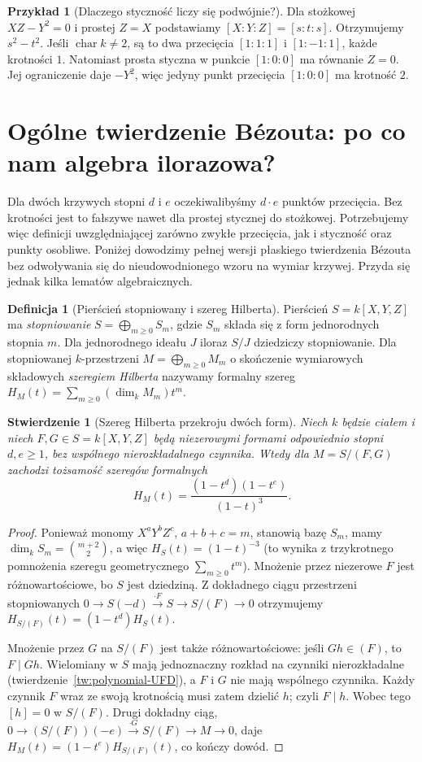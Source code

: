 \documentclass[11pt,a4paper,openany]{report}
\numberwithin{equation}{section}
\theoremstyle{plain}
\newtheorem{stwierdzenie}[twierdzenie]{Stwierdzenie}
\theoremstyle{definition}
\newtheorem{definicja}[twierdzenie]{Definicja}
\newtheorem{przyklad}[twierdzenie]{Przykład}
\theoremstyle{remark}
\begin{document}
\begin{przyklad}[Dlaczego styczność liczy się podwójnie?]
Dla stożkowej $XZ-Y^2=0$ i prostej $Z=X$ podstawiamy
$[X:Y:Z]=[s:t:s]$. Otrzymujemy $s^2-t^2$.
Jeśli $\operatorname{char}k\ne2$, są to dwa przecięcia
$[1:1:1]$ i $[1:-1:1]$, każde krotności $1$.
Natomiast prosta styczna w punkcie $[1:0:0]$ ma równanie
$Z=0$. Jej ograniczenie daje $-Y^2$, więc jedyny punkt
przecięcia $[1:0:0]$ ma krotność $2$.
\end{przyklad}

\section{Ogólne twierdzenie Bézouta: po co nam algebra ilorazowa?}

Dla dwóch krzywych stopni $d$ i $e$ oczekiwalibyśmy
$d\cdot e$ punktów przecięcia. Bez krotności jest to
fałszywe nawet dla prostej stycznej do stożkowej.
Potrzebujemy więc definicji uwzględniającej zarówno
zwykłe przecięcia, jak i styczność oraz punkty osobliwe.
Poniżej dowodzimy pełnej wersji płaskiego twierdzenia Bézouta
bez odwoływania się do nieudowodnionego wzoru na wymiar krzywej.
Przyda się jednak kilka lematów algebraicznych.

\begin{definicja}[Pierścień stopniowany i szereg Hilberta]
Pierścień $S=k[X,Y,Z]$ ma \emph{stopniowanie}
$S=\bigoplus_{m\ge0}S_m$, gdzie $S_m$ składa się z form
jednorodnych stopnia $m$. Dla jednorodnego ideału $J$
iloraz $S/J$ dziedziczy stopniowanie.
Dla stopniowanej $k$-przestrzeni $M=\bigoplus_{m\ge0}M_m$
o skończenie wymiarowych składowych \emph{szeregiem Hilberta}
nazywamy formalny szereg
$H_M(t)=\sum_{m\ge0}(\dim_kM_m)t^m$.
\end{definicja}

\begin{stwierdzenie}[Szereg Hilberta przekroju dwóch form]
\label{st:hilbert-complete-intersection}
Niech $k$ będzie ciałem i niech $F,G\in S=k[X,Y,Z]$
będą niezerowymi formami odpowiednio stopni $d,e\ge1$,
bez wspólnego nierozkładalnego czynnika. Wtedy dla
$M=S/(F,G)$ zachodzi tożsamość szeregów formalnych
\[
 H_M(t)=\frac{(1-t^d)(1-t^e)}{(1-t)^3}.
\]
\end{stwierdzenie}
\begin{proof}
Ponieważ monomy $X^aY^bZ^c$, $a+b+c=m$, stanowią bazę
$S_m$, mamy $\dim_kS_m=\binom{m+2}{2}$, a więc
$H_S(t)=(1-t)^{-3}$ (to wynika z trzykrotnego
pomnożenia szeregu geometrycznego $\sum_{m\ge0}t^m$).
Mnożenie przez niezerowe $F$ jest różnowartościowe,
bo $S$ jest dziedziną. Z dokładnego ciągu przestrzeni
stopniowanych $0\to S(-d)\xrightarrow{\cdot F}S\to S/(F)\to0$
otrzymujemy $H_{S/(F)}(t)=(1-t^d)H_S(t)$.

Mnożenie przez $G$ na $S/(F)$ jest także różnowartościowe:
jeśli $Gh\in(F)$, to $F\mid Gh$. Wielomiany w $S$
mają jednoznaczny rozkład na czynniki nierozkładalne
(twierdzenie~\ref{tw:polynomial-UFD}),
a $F$ i $G$ nie mają wspólnego czynnika. Każdy czynnik
$F$ wraz ze swoją krotnością musi zatem dzielić $h$;
czyli $F\mid h$. Wobec tego $[h]=0$ w $S/(F)$.
Drugi dokładny ciąg,
$0\to(S/(F))(-e)\xrightarrow{\cdot G}S/(F)\to M\to0$,
daje $H_M(t)=(1-t^e)H_{S/(F)}(t)$, co kończy dowód.
\end{proof}
\end{document}
